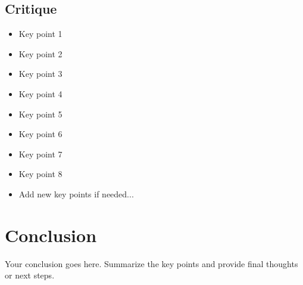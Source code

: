 \documentclass[10pt,a4paper]{article}
\begin{document}
\begin{multicols}{2}
\section*{Critique}
\begin{itemize}\normalsize
  \item Key point 1
  \item Key point 2
  \item Key point 3
  \item Key point 4
  \item Key point 5
  \item Key point 6
  \item Key point 7
  \item Key point 8
  \item Add new key points if needed...
\end{itemize}
\end{multicols}

\vspace{1cm}

\section*{Conclusion}
\normalsize
Your conclusion goes here. Summarize the key points and provide final thoughts or next steps.
\end{document}
